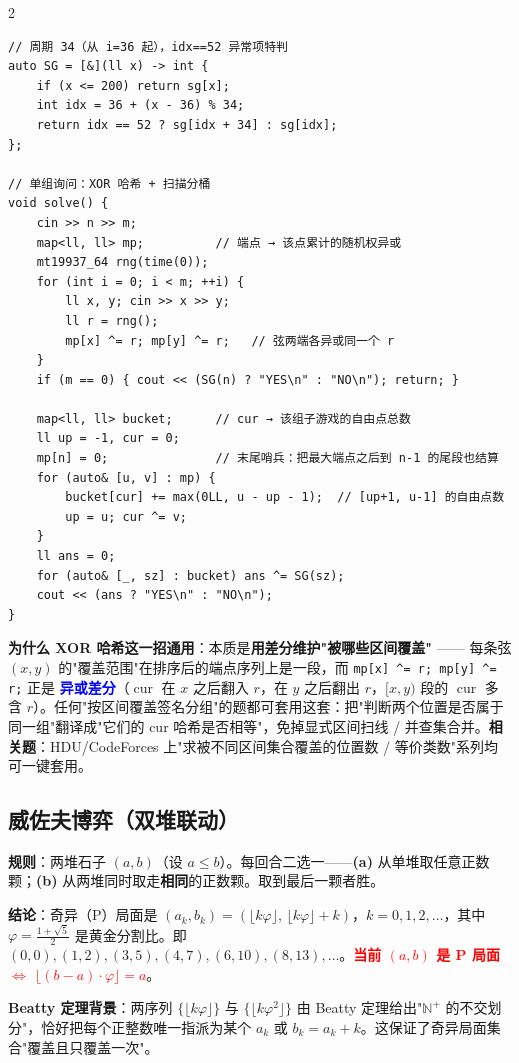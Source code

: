 \begin{multicols*}{2}
\begin{verbatim}
// 周期 34（从 i=36 起），idx==52 异常项特判
auto SG = [&](ll x) -> int {
    if (x <= 200) return sg[x];
    int idx = 36 + (x - 36) % 34;
    return idx == 52 ? sg[idx + 34] : sg[idx];
};

// 单组询问：XOR 哈希 + 扫描分桶
void solve() {
    cin >> n >> m;
    map<ll, ll> mp;          // 端点 → 该点累计的随机权异或
    mt19937_64 rng(time(0));
    for (int i = 0; i < m; ++i) {
        ll x, y; cin >> x >> y;
        ll r = rng();
        mp[x] ^= r; mp[y] ^= r;   // 弦两端各异或同一个 r
    }
    if (m == 0) { cout << (SG(n) ? "YES\n" : "NO\n"); return; }

    map<ll, ll> bucket;      // cur → 该组子游戏的自由点总数
    ll up = -1, cur = 0;
    mp[n] = 0;               // 末尾哨兵：把最大端点之后到 n-1 的尾段也结算
    for (auto& [u, v] : mp) {
        bucket[cur] += max(0LL, u - up - 1);  // [up+1, u-1] 的自由点数
        up = u; cur ^= v;
    }
    ll ans = 0;
    for (auto& [_, sz] : bucket) ans ^= SG(sz);
    cout << (ans ? "YES\n" : "NO\n");
}
		\end{verbatim}

		\textbf{为什么 XOR 哈希这一招通用}：本质是\textbf{用差分维护"被哪些区间覆盖"} —— 每条弦 $(x, y)$ 的"覆盖范围"在排序后的端点序列上是一段，而 \texttt{mp[x] \^{}= r; mp[y] \^{}= r;} 正是 \textcolor{blue}{\textbf{异或差分}}（$\operatorname{cur}$ 在 $x$ 之后翻入 $r$，在 $y$ 之后翻出 $r$，$[x, y)$ 段的 $\operatorname{cur}$ 多含 $r$）。任何"按区间覆盖签名分组"的题都可套用这套：把"判断两个位置是否属于同一组"翻译成"它们的 cur 哈希是否相等"，免掉显式区间扫线 / 并查集合并。\textbf{相关题}：HDU/CodeForces 上"求被不同区间集合覆盖的位置数 / 等价类数"系列均可一键套用。

		\subsection{威佐夫博弈（双堆联动）}

		\textbf{规则}：两堆石子 $(a, b)$（设 $a \le b$）。每回合二选一——\textbf{(a)} 从单堆取任意正数颗；\textbf{(b)} 从两堆同时取走\textbf{相同}的正数颗。取到最后一颗者胜。

		\textbf{结论}：奇异（P）局面是 $(a_k, b_k) = (\lfloor k\varphi \rfloor,\, \lfloor k\varphi \rfloor + k)$，$k = 0, 1, 2, \dots$，其中 $\varphi = \frac{1+\sqrt{5}}{2}$ 是黄金分割比。即 $(0,0), (1,2), (3,5), (4,7), (6,10), (8,13), \dots$。\textcolor{red}{\textbf{当前 $(a,b)$ 是 P 局面 $\iff$ $\lfloor (b - a) \cdot \varphi \rfloor = a$}}。

		\textbf{Beatty 定理背景}：两序列 $\{\lfloor k\varphi \rfloor\}$ 与 $\{\lfloor k\varphi^2 \rfloor\}$ 由 Beatty 定理给出"$\mathbb{N}^+$ 的不交划分"，恰好把每个正整数唯一指派为某个 $a_k$ 或 $b_k = a_k + k$。这保证了奇异局面集合"覆盖且只覆盖一次"。


\end{multicols*}
